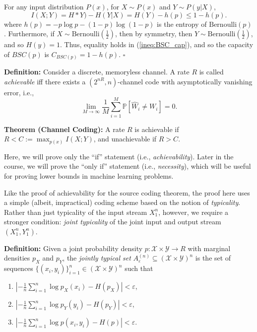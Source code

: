 \documentclass[twoside]{article}
\newcommand\pr{\mathbb{P}}      %
\newcommand\X{\mathcal{X}}
\newcommand\Y{\mathcal{Y}}
\newcommand\e{\varepsilon}
\newcommand\qed{\qquad\ensuremath{\square}}
\renewcommand\hat{\widehat}
\begin{document}
For any input distribution $P(x)$, for $X \sim P(x)$ and $Y \sim P(y|X)$,
\begin{equation}
I(X; Y)
    = H*Y) - H(Y | X)
    = H(Y) - h(p)
    \leq 1 - h(p).
\label{ineq:BSC_cap}
\end{equation}
where $h(p) = -p \log p - (1 - p) \log(1 - p)$ is the entropy of
$\mbox{Bernoulli}(p)$. Furthermore, if $X \sim \mbox{Bernoulli}(\frac12)$, then
by symmetry, then $Y \sim \mbox{Bernoulli}(\frac12)$, and so $H(y) = 1$. Thus,
equality holds in (\ref{ineq:BSC_cap}), and so the capacity of $BSC(p)$ is
$C_{BSC(p)} = 1 - h(p)$. \qed

{\bf Definition:} Consider a discrete, memoryless channel. A rate $R$ is called
\emph{achievable} iff there exists a $(2^{nR}, n)$-channel code with
asymptotically vanishing error, i.e.,
\[\lim_{M \to \infty}
    \frac{1}{M} \sum_{i = 1}^M \pr\left[ \hat W_i \neq W_i \right] = 0.\]

{\bf Theorem (Channel Coding):} A rate $R$ is achievable if
$R < C := \max_{p(x)} I(X;Y)$, and unachievable if $R > C$.

Here, we will prove only the ``if'' statement (i.e., \emph{achievability}).
Later in the course, we will prove the ``only if'' statement (i.e.,
\emph{necessity}), which will be useful for proving lower bounds in machine
learning problems.

Like the proof of achievability for the source
coding theorem, the proof here uses a simple (albeit, impractical) coding
scheme based on the notion of \emph{typicality}. Rather than just typicality of
the input stream $X_1^n$, however, we require a stronger condition:
\emph{joint typicality} of the joint input and output stream $(X_1^n,Y_1^n)$.

\newpage
{\bf Definition:} Given a joint probability density $p : \X \times \Y \to R$
with marginal densities $p_X$ and $p_Y$, the \emph{jointly typical set}
$A_\e^{(n)} \subseteq \left( \X \times \Y \right)^n$ is the set of sequences
$\{(x_i,y_i)\}_{i = 1}^n \in \left( \X \times \Y \right)^n$ such that
\begin{enumerate}
\item $\left| -\frac{1}{n} \sum_{i = 1}^n \log p_X(x_i) - H(p_X)\right| < \e$,
\item $\left| -\frac{1}{n} \sum_{i = 1}^n \log p_Y(y_i) - H(p_Y)\right| < \e$,
\item $\left| -\frac{1}{n} \sum_{i = 1}^n \log p(x_i,y_i) - H(p)\right| < \e$.
\end{enumerate}
\end{document}
